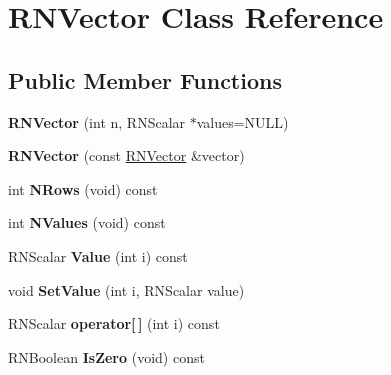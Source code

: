 \hypertarget{class_r_n_vector}{}\section{R\+N\+Vector Class Reference}
\label{class_r_n_vector}
\subsection*{Public Member Functions}
\begin{DoxyCompactItemize}
\item 
{\bfseries R\+N\+Vector} (int n, R\+N\+Scalar $\ast$values=N\+U\+LL)\hypertarget{class_r_n_vector_ad80bbd3e12b599d7811c55b2448af622}{}\label{class_r_n_vector_ad80bbd3e12b599d7811c55b2448af622}

\item 
{\bfseries R\+N\+Vector} (const \hyperlink{class_r_n_vector}{R\+N\+Vector} \&vector)\hypertarget{class_r_n_vector_a0dcb460b7c5d6def7a29ba5f7ed8705b}{}\label{class_r_n_vector_a0dcb460b7c5d6def7a29ba5f7ed8705b}

\item 
int {\bfseries N\+Rows} (void) const \hypertarget{class_r_n_vector_a15302186822cbe1dc29329502b7b092f}{}\label{class_r_n_vector_a15302186822cbe1dc29329502b7b092f}

\item 
int {\bfseries N\+Values} (void) const \hypertarget{class_r_n_vector_a68817a8f780d1d45028adf0f783a9d18}{}\label{class_r_n_vector_a68817a8f780d1d45028adf0f783a9d18}

\item 
R\+N\+Scalar {\bfseries Value} (int i) const \hypertarget{class_r_n_vector_ae6bf135620595a7aef10d1a327c22afe}{}\label{class_r_n_vector_ae6bf135620595a7aef10d1a327c22afe}

\item 
void {\bfseries Set\+Value} (int i, R\+N\+Scalar value)\hypertarget{class_r_n_vector_a0293604a55a18a0ff17ed6ea8acd7b05}{}\label{class_r_n_vector_a0293604a55a18a0ff17ed6ea8acd7b05}

\item 
R\+N\+Scalar {\bfseries operator\mbox{[}$\,$\mbox{]}} (int i) const \hypertarget{class_r_n_vector_a75031f54ae3e660af19689cd8d37487a}{}\label{class_r_n_vector_a75031f54ae3e660af19689cd8d37487a}

\item 
R\+N\+Boolean {\bfseries Is\+Zero} (void) const \hypertarget{class_r_n_vector_a37d9739ed672542523dee83187373c63}{}\label{class_r_n_vector_a37d9739ed672542523dee83187373c63}


\end{DoxyCompactItemize}
